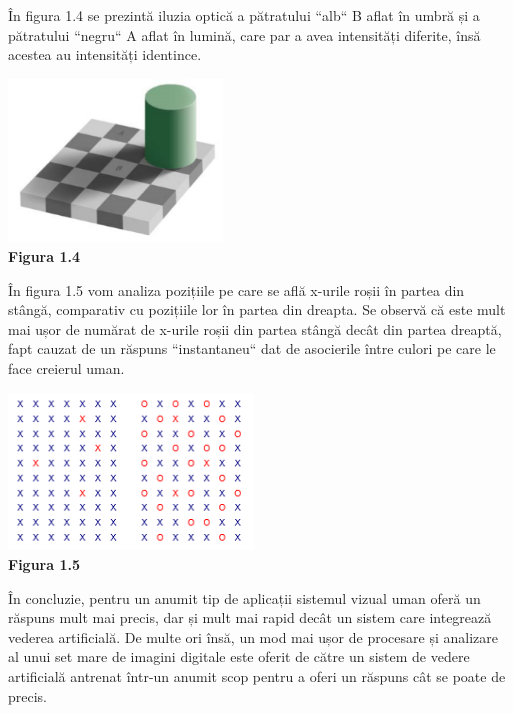 \documentclass[a4paper,12pt]{report}
\newcommand\tab[1][1cm]{\hspace*{#1}}
\begin{document}
\tab În figura 1.4 se prezintă iluzia optică a pătratului ``alb`` B aflat în umbră și a pătratului ``negru`` A aflat în lumină, care par a avea intensități diferite, însă acestea au intensități identince. 
\newline
\begin {center} 
	\begin {footnotesize} 
		\includegraphics[width = 57mm]{fig1_4} \\
		\textbf  {Figura 1.4} 
	\end {footnotesize} 
\end {center}
\tab În figura 1.5 vom analiza pozițiile pe care se află x-urile roșii în partea din stângă, comparativ cu pozițiile lor în partea din dreapta. Se observă că este mult mai ușor de numărat de x-urile
roșii din partea stângă decât din partea dreaptă, fapt cauzat de un răspuns ``instantaneu`` dat de asocierile între culori pe care le face creierul uman. 
\newline
\begin {center} 
	\begin {footnotesize} 
		\includegraphics[width = 65mm]{fig1_5} \\
		\textbf  {Figura 1.5} 
	\end {footnotesize} 
\end {center}
\tab În concluzie, pentru un anumit tip de aplicații sistemul vizual uman oferă un răspuns mult mai precis, dar și mult mai rapid decât un sistem care integrează vederea artificială. De multe ori însă, un mod
mai ușor de procesare și analizare al unui set mare de imagini digitale este oferit de către un sistem de vedere artificială antrenat într-un anumit scop pentru a oferi un răspuns cât se poate de precis. 
\end{document}

